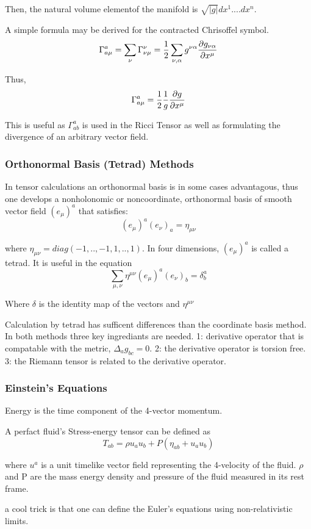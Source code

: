 Then, the natural volume elementof the manifold is $\sqrt{|g|}dx^1....dx^n$.

A simple formula may be derived for the contracted Chrisoffel symbol.
\[
\Gamma^a_{a \mu} = \sum_\nu \Gamma^\nu_{\nu \mu} = \frac 1 2 \sum_{\nu, \alpha} g^{\nu \alpha} \pdv{g_{\nu \alpha}}{x^\mu}
\]

Thus,
\[
\Gamma^a_{a \mu} = \frac 1 2 \frac{1}{g} \pdv{g}{x^\mu}
\]

This is useful as $\Gamma^a_{ab}$ is used in the Ricci Tensor as well as formulating the divergence of an arbitrary vector field.

\subsubsection{Orthonormal Basis (Tetrad) Methods}

In tensor calculations an orthonormal basis is in some cases advantagous, thus one develops a nonholonomic or noncoordinate, orthonormal basis of smooth vector field $(e_\mu)^a$ that satisfies:
\[
(e_\mu)^a(e_\nu)_a= \eta_{\mu \nu}
\]

where $\eta_{\mu \nu}= diag(-1,..,-1,1,..,1)$. In four dimensions, $(e_\mu)^a$ is called a tetrad. It is useful in the equation
\[
\sum_{\mu, \nu}\eta^{\mu \nu}(e_\mu)^a(e_\nu)_b = \delta^a_b
\]

Where $\delta$ is the identity map of the vectors and $\eta^{\mu \nu}$

Calculation by tetrad has sufficent differences than the coordinate basis method. In both methods three key ingrediants are needed. 1: derivative operator that is compatable with the metric, $\Delta_a g_{bc} = 0$. 2: the derivative operator is torsion free. 3: the Riemann tensor is related to the derivative operator.

\subsubsection{Einstein's Equations}
Energy is the time component of the 4-vector momentum.

A perfact fluid's Stress-energy tensor can be defined as
\[
T_{ab} = \rho u_a u_b + P(\eta_{ab}+ u_au_b)
\]

where $u^a$ is a unit timelike vector field representing the 4-velocity of the fluid. $\rho$ and P are the mass energy density and pressure of the fluid measured in its rest frame.

a cool trick is that one can define the Euler's equations using non-relativistic limits.

